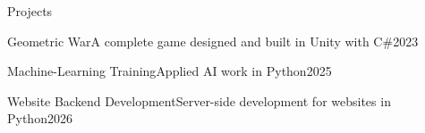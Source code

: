 \begin{section}{Projects}

    \begin{subsectionnobullet}{Geometric War}{A complete game designed and built in Unity with C\#}{2023}{}
    \end{subsectionnobullet}

    \begin{subsectionnobullet}{Machine-Learning Training}{Applied AI work in Python}{2025}{}
    \end{subsectionnobullet}

    \begin{subsectionnobullet}{Website Backend Development}{Server-side development for websites in Python}{2026}{}
    \end{subsectionnobullet}

\end{section}
